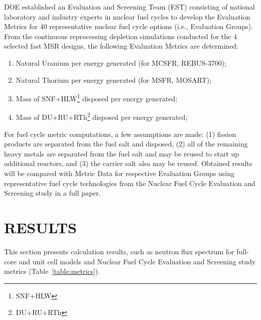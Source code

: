 \documentclass{anstrans}
\begin{document}
DOE established an Evaluation and Screening Team (EST) consisting of national laboratory and industry experts in nuclear fuel cycles to develop the Evaluation Metrics for 40 representative nuclear fuel cycle options (i.e., Evaluation Groups). From the continuous reprocessing depletion simulations conducted for the 4 selected fast \gls{MSR} designs, the following Evaluation Metrics are determined:
\vspace{-0.08in}
\begin{enumerate}
	\item Natural Uranium per energy generated (for \gls{MCSFR}, REBUS-3700);\vspace{-0.11in}
	\item Natural Thorium per energy generated (for \gls{MSFR}, \gls{MOSART});\vspace{-0.11in}
	\item Mass of SNF+HLW\footnote{\gls{SNF}+\gls{HLW}} disposed per energy generated;\vspace{-0.11in}
	\item Mass of DU+RU+RTh\footnote{\gls{DU}+\gls{RU}+\gls{RTh}} disposed per energy  generated;\vspace{-0.08in}
\end{enumerate}
For fuel cycle metric computations, a few assumptions are made: 
(1) fission products are separated from the fuel salt and disposed, 
(2) all of the remaining heavy metals are separated from the fuel salt and may be reused to start up additional reactors, and 
(3) the carrier salt also may be reused. 
Obtained results will be compared with Metric Data for respective Evaluation Groups using representative fuel cycle technologies from the Nuclear Fuel Cycle Evaluation and Screening study \cite{wigeland_nuclear_2014} in a full paper.

\section{RESULTS} 
This section presents calculation results, such as neutron flux spectrum for full-core and unit cell models and Nuclear Fuel Cycle Evaluation and Screening study metrics (Table~\ref{table:metrics}).
\end{document}
